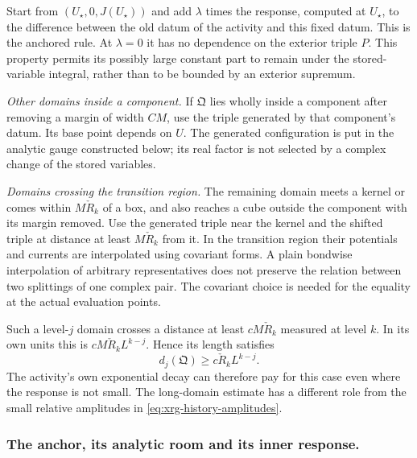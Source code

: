 \documentclass[11pt,letterpaper,reqno]{amsart}
\theoremstyle{definition}
\theoremstyle{remark}
\begin{document}
Start from $(U_\star,0,J(U_\star))$ and add $\lambda$ times the
response, computed at $U_\star$, to the difference between the
old datum of the activity and this fixed datum. This is the
anchored rule. At $\lambda=0$ it has no dependence on the exterior
triple $P$. This property permits its possibly large constant part
to remain under the stored-variable integral, rather than to be
bounded by an exterior supremum.

\emph{Other domains inside a component.}
If $\mathfrak Q$ lies wholly inside a component after removing
a margin of width $CM$, use the triple generated by that
component's datum. Its base point depends on $U$. The generated
configuration is put in the analytic gauge constructed below;
its real factor is not selected by a complex change of the
stored variables.

\emph{Domains crossing the transition region.}
The remaining domain meets a kernel or comes within
$M\check R_k$ of a box, and also reaches a cube outside the
component with its margin removed. Use the generated triple
near the kernel and the shifted triple at distance at least
$M\check R_k$ from it. In the transition region their potentials
and currents are interpolated using covariant forms. A plain
bondwise interpolation of arbitrary representatives does not
preserve the relation between two splittings of one complex pair.
The covariant choice is needed for the equality at the actual
evaluation points.

Such a level-$j$ domain crosses a distance at least
$cM\check R_k$ measured at level $k$. In its own units this is
$cM\check R_kL^{k-j}$. Hence its length satisfies
\begin{equation}\label{eq:joined-long-domain}
 d_j(\mathfrak Q)\ge c\check R_kL^{k-j}.
\end{equation}
The activity's own exponential decay can therefore pay for this
case even where the response is not small. The long-domain
estimate has a different role from the small relative amplitudes
in \eqref{eq:xrg-history-amplitudes}.

\subsubsection*{The anchor, its analytic room and its inner response.}
\end{document}
